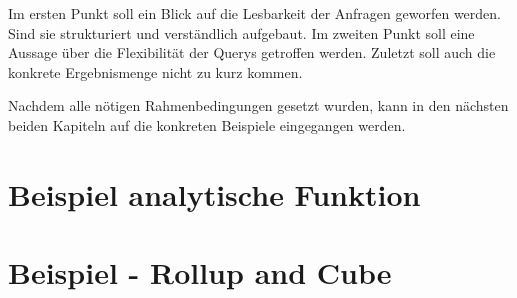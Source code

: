 Im ersten Punkt soll ein Blick auf die Lesbarkeit der Anfragen geworfen werden. Sind
sie strukturiert und verständlich aufgebaut. Im zweiten Punkt soll eine Aussage
über die Flexibilität der Querys getroffen werden. Zuletzt soll auch die konkrete
Ergebnismenge nicht zu kurz kommen.

Nachdem alle nötigen Rahmenbedingungen gesetzt wurden, kann in den nächsten
beiden Kapiteln auf die konkreten Beispiele eingegangen werden.

\section{Beispiel analytische Funktion}

\section{Beispiel - Rollup and Cube}